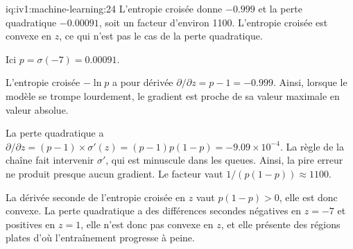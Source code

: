 \begin{solution}{iq:iv1:machine-learning:24}
L'entropie croisée donne $-0.999$ et la perte quadratique $-0.00091$, soit un facteur d'environ 1100. L'entropie croisée est convexe en $z$, ce qui n'est pas le cas de la perte quadratique.

Ici $p = \sigma(-7) = 0.00091$.

L'entropie croisée $-\ln p$ a pour dérivée $\partial/\partial z = p - 1 = -0.999$. Ainsi, lorsque le modèle se trompe lourdement, le gradient est proche de sa valeur maximale en valeur absolue.

La perte quadratique a $\partial/\partial z = (p - 1) \times \sigma'(z) = (p - 1)p(1 - p) = -9.09 \times 10^{-4}$. La règle de la chaîne fait intervenir $\sigma'$, qui est minuscule dans les queues. Ainsi, la pire erreur ne produit presque aucun gradient. Le facteur vaut $1/(p(1 - p)) \approx 1100$.

La dérivée seconde de l'entropie croisée en $z$ vaut $p(1 - p) > 0$, elle est donc convexe. La perte quadratique a des différences secondes négatives en $z = -7$ et positives en $z = 1$, elle n'est donc pas convexe en $z$, et elle présente des régions plates d'où l'entraînement progresse à peine.



\end{solution}

